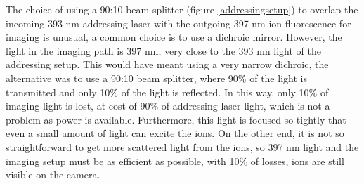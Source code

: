 The choice of using a 90:10 beam splitter (figure \ref{addressingsetup}) to overlap the incoming 393 nm addressing laser with the outgoing 397 nm ion fluorescence for imaging is unusual, a common choice is to use a dichroic mirror. However, the light in the imaging path is 397 nm, very close to the 393 nm light of the addressing setup. This would have meant using a very narrow dichroic, the alternative was to use a 90:10 beam splitter, where 90\% of the light is transmitted and only 10\% of the light is reflected. In this way, only 10\% of imaging light is lost, at cost of 90\% of addressing laser light, which is not a problem as power is available. Furthermore, this light is focused so tightly that even a small amount of light can excite the ions. On the other end, it is not so straightforward to get more scattered light from the ions, so 397 nm light and the imaging setup must be as efficient as possible, with 10\% of losses, ions are still visible on the camera.

